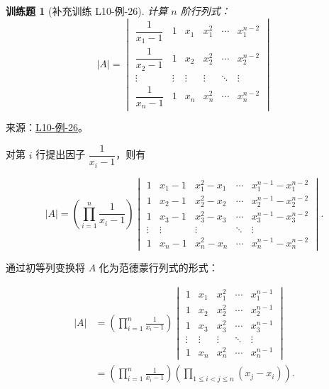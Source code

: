 \documentclass[12pt,fontset=fandol]{ctexart}
\newtheorem{exercise}{训练题}[section]
\begin{document}
\begin{exercise}[补充训练 L10-例-26]\label{prob:L10-例-26}
计算 $n$ 阶行列式：
    \[
        |A| = \begin{vmatrix}
            \dfrac{1}{x_1 - 1} & 1      & x_1    & x_1^2  & \cdots & x_1^{n-2} \\[1.2em]
            \dfrac{1}{x_2 - 1} & 1      & x_2    & x_2^2  & \cdots & x_2^{n-2} \\[1.2em]
            \vdots             & \vdots & \vdots & \vdots & \ddots & \vdots    \\[1.2em]
            \dfrac{1}{x_n - 1} & 1      & x_n    & x_n^2  & \cdots & x_n^{n-2}
        \end{vmatrix}
    \]
\end{exercise}
\noindent 来源：\href{https://github.com/yhwu-is/Linear-Algebra-Left-Undone/blob/new/%E8%AE%B2%E4%B9%89/%E4%B8%93%E9%A2%98/10%20%E8%A1%8C%E5%88%97%E5%BC%8F.tex}{L10-例-26}。
\begin{solve}
对第 $i$ 行提出因子 $\dfrac{1}{x_i-1}$，则有

    \[
        |A| = \left(\displaystyle\prod_{i=1}^n \frac{1}{x_i-1} \right) \begin{vmatrix}
            1 & x_1 - 1 & x_1^2 - x_1 & \cdots & x_1^{n-1} - x_1^{n-2} \\
            1 & x_2 - 1 & x_2^2 - x_2 & \cdots & x_2^{n-1} - x_2^{n-2} \\
            1 & x_3 - 1 & x_3^2 - x_3 & \cdots & x_3^{n-1} - x_3^{n-2} \\
            \vdots & \vdots & \vdots & \ddots & \vdots \\
            1 & x_n - 1 & x_n^2 - x_n & \cdots & x_n^{n-1} - x_n^{n-2}
        \end{vmatrix}.
    \]

    通过初等列变换将 $A$ 化为范德蒙行列式的形式：

    \begin{align*}
        |A| &= \left(\displaystyle\prod_{i=1}^n \frac{1}{x_i-1} \right) \begin{vmatrix}
            1 & x_1 & x_1^2 & \cdots & x_1^{n-1} \\
            1 & x_2 & x_2^2 & \cdots & x_2^{n-1} \\
            1 & x_3 & x_3^2 & \cdots & x_3^{n-1} \\
            \vdots & \vdots & \vdots & \ddots & \vdots \\
            1 & x_n & x_n^2 & \cdots & x_n^{n-1}
        \end{vmatrix} \\
        &= \left(\displaystyle\prod_{i=1}^n \frac{1}{x_i-1} \right)
           \left(\displaystyle\prod_{1 \leqslant i < j \leqslant n} (x_j - x_i)\right).
    \end{align*}
\end{solve}
\end{document}
